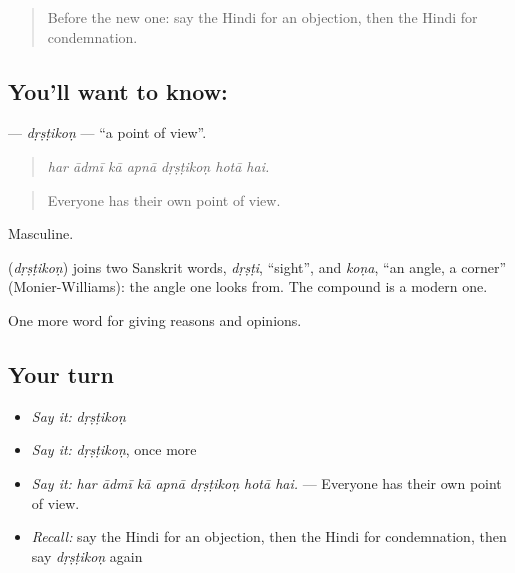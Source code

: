 \label{lesson:HI-C360-drstikon}



\begin{quote}
Before the new one: say the Hindi for an objection, then the Hindi for condemnation.
\end{quote}

\subsection*{You'll want to know: }
\textbf{} — \emph{dṛṣṭikoṇ} — \textquotedblleft{}a point of view\textquotedblright{}.

\begin{quote}
      
\end{quote}

\begin{quote}
\emph{har ādmī kā apnā dṛṣṭikoṇ hotā hai.}
\end{quote}

\begin{quote}
Everyone has their own point of view.
\end{quote}

Masculine.

\begin{cousinweb}
\textbf{} (\emph{dṛṣṭikoṇ}) joins two Sanskrit words, \emph{dṛṣṭi}, \textquotedblleft{}sight\textquotedblright{}, and \emph{koṇa}, \textquotedblleft{}an angle, a corner\textquotedblright{} (Monier-Williams): the angle one looks from. The compound is a modern one.
\end{cousinweb}

\begin{grammarlens}[title={What you've built}]
One more word for giving reasons and opinions.
\end{grammarlens}

\subsection*{Your turn}
\begin{itemize}
\raggedright
  \item \emph{Say it:} \emph{dṛṣṭikoṇ}
  \item \emph{Say it:} \emph{dṛṣṭikoṇ}, once more
  \item \emph{Say it:} \emph{har ādmī kā apnā dṛṣṭikoṇ hotā hai.} — Everyone has their own point of view.
  \item \emph{Recall:} say the Hindi for an objection, then the Hindi for condemnation, then say \emph{dṛṣṭikoṇ} again
\end{itemize}


